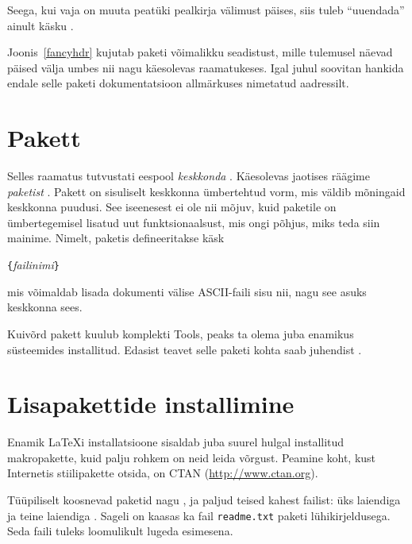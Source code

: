 Seega, kui vaja on muuta peatüki pealkirja välimust päises, siis tuleb
"`uuendada"' ainult käsku .

Joonis~\ref{fancyhdr} kujutab paketi  võimalikku
seadistust, mille tulemusel näevad päised välja umbes nii nagu käesolevas
raamatukeses. Igal juhul soovitan hankida endale selle paketi
dokumentatsioon allmärkuses nimetatud aadressilt.

\section{Pakett }

Selles raamatus tutvustati eespool \emph{keskkonda} .
Käesolevas jaotises räägime \emph{paketist} . Pakett
 on sisuliselt keskkonna  ümbertehtud vorm,
mis väldib mõningaid keskkonna  puudusi. See iseenesest ei
ole nii mõjuv, kuid paketile  on ümbertegemisel lisatud
uut funktsionaalsust, mis ongi põhjus, miks teda siin mainime. Nimelt,
paketis  defineeritakse käsk

\begin{lscommand}
\verb|{|\emph{failinimi}\verb|}|
\end{lscommand}

\noindent mis võimaldab lisada dokumenti välise ASCII-faili sisu nii,
nagu see asuks keskkonna  sees.

Kuivõrd pakett  kuulub komplekti Tools, peaks ta olema juba
enamikus süsteemides installitud. Edasist teavet selle paketi kohta saab
juhendist \cite{verbatim}.

\section{Lisapakettide installimine}\label{sec:Packages}

Enamik \LaTeX i installatsioone sisaldab juba suurel hulgal
installitud makropakette, kuid palju rohkem on neid leida võrgust.
Peamine koht, kust Internetis stiilipakette otsida, on CTAN
(\url{http://www.ctan.org}).

Tüüpiliselt koosnevad paketid nagu ,  ja
paljud teised kahest failist: üks laiendiga  ja teine
laiendiga . Sageli on kaasas ka fail \texttt{readme.txt}
paketi lühikirjeldusega. Seda faili tuleks loomulikult lugeda esimesena.

